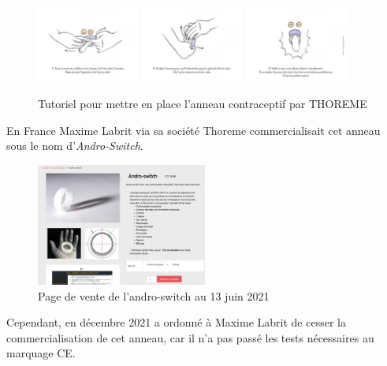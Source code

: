 \documentclass[12pt,a4paper]{report}
\begin{document}
\begin{figure}[h]
    \includegraphics[width=0.3\textwidth]{images/scientiphique/Tuto_andro_switch/7.png}
    \includegraphics[width=0.3\textwidth]{images/scientiphique/Tuto_andro_switch/8.png}
    \includegraphics[width=0.3\textwidth]{images/scientiphique/Tuto_andro_switch/9.png}
    \caption{Tutoriel pour mettre en place l'anneau contraceptif par THOREME}
    \label{fig:tuto_andro_switch}
\end{figure}

En France Maxime Labrit via sa société Thoreme commercialisait cet anneau sous le nom d'\textit{Andro-Switch}. \cite{guillaumedaudinContraceptesEnqueteDernier2022}

\begin{figure}[H]
    \centering
    \includegraphics[width=0.5\textwidth]{images/scientiphique/vente_andro_switch.png}
    \caption{Page de vente de l'andro-switch au 13 juin 2021}
    \label{fig:vente_andro_switch}
\end{figure}

Cependant, en décembre 2021 a ordonné à Maxime Labrit de cesser la commercialisation de cet anneau, car il n'a pas passé les tests nécessaires au marquage CE. \cite{ActualiteAnneauContraceptif}
\end{document}
